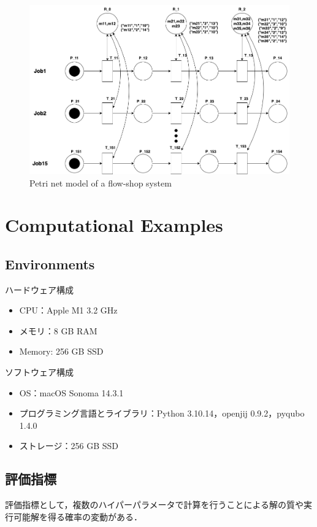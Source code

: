 \documentclass[conference]{IEEEtran}
\begin{document}
\begin{figure}[htbp]
\centerline{\includegraphics[scale=0.25]{./fig/fsp.pdf}}
\caption{Petri net model of a flow-shop system}
\label{fig1}
\end{figure}



\section{Computational Examples}
\subsection{Environments}
ハードウェア構成
\begin{itemize}
\item CPU：Apple M1 3.2 GHz
\item メモリ：8 GB RAM
\item Memory: 256 GB SSD
\end{itemize}

\vspace{\baselineskip}

ソフトウェア構成 
\begin{itemize}
\item OS：macOS Sonoma 14.3.1
\item プログラミング言語とライブラリ：Python 3.10.14，openjij 0.9.2，pyqubo 1.4.0
\item ストレージ：256 GB SSD
\end{itemize}

\subsection{評価指標}
評価指標として，複数のハイパーパラメータで計算を行うことによる解の質や実行可能解を得る確率の変動がある．
\end{document}
